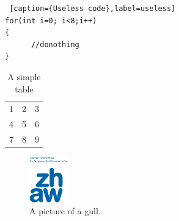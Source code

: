%
%
\begin{lstlisting} [caption={Useless code},label=useless]
for(int i=0; i<8;i++) 
{
      //donothing
}
\end{lstlisting}


%
%
\cite{Sch96:crypt}


%
%
\begin{table}[h!]
  \begin{center}
    \begin{tabular}{| l c r |}
    \hline
    1 & 2 & 3 \\
    4 & 5 & 6 \\
    7 & 8 & 9 \\
    \hline
    \end{tabular}
  \end{center}
  \caption{A simple table}
\end{table}

%
%
\begin{figure}[h!]
  \centering
    \includegraphics[width=0.15\textwidth]{./img/logo_zhaw.png}
  \caption{A picture of a gull.}
\end{figure}
